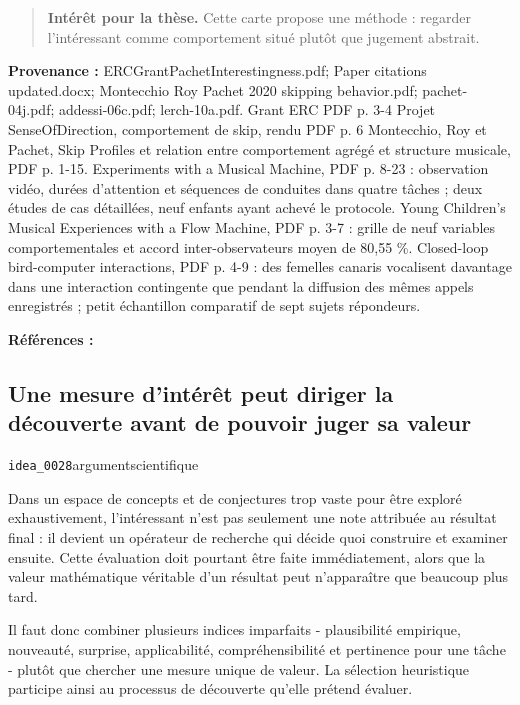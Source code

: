 \documentclass[10pt,a4paper]{article}
\begin{document}
\begin{quote}
\textbf{Intérêt pour la thèse.} Cette carte propose une méthode : regarder l'intéressant comme comportement situé plutôt que jugement abstrait.
\end{quote}
{\footnotesize\color{metadata}\textbf{Provenance :} ERCGrantPachetInterestingness.pdf; Paper citations updated.docx; Montecchio Roy Pachet 2020 skipping behavior.pdf; pachet-04j.pdf; addessi-06c.pdf; lerch-10a.pdf. Grant ERC PDF p. 3-4 Projet SenseOfDirection, comportement de skip, rendu PDF p. 6 Montecchio, Roy et Pachet, Skip Profiles et relation entre comportement agrégé et structure musicale, PDF p. 1-15. Experiments with a Musical Machine, PDF p. 8-23 : observation vidéo, durées d'attention et séquences de conduites dans quatre tâches ; deux études de cas détaillées, neuf enfants ayant achevé le protocole. Young Children's Musical Experiences with a Flow Machine, PDF p. 3-7 : grille de neuf variables comportementales et accord inter-observateurs moyen de 80,55 \%. Closed-loop bird-computer interactions, PDF p. 4-9 : des femelles canaris vocalisent davantage dans une interaction contingente que pendant la diffusion des mêmes appels enregistrés ; petit échantillon comparatif de sept sujets répondeurs.\par}
{\footnotesize\color{metadata}\textbf{Références :} \parencite{montecchio2020skipping,addessi2005experiments,addessi2006flowmachine,lerch2011closedloop}\par}

\subsection{Une mesure d'intérêt peut diriger la découverte avant de pouvoir juger sa valeur}
{\small\color{metadata} \texttt{idea\_0028}\quad\textbullet\quad argument\quad\textbullet\quad scientifique\par}

Dans un espace de concepts et de conjectures trop vaste pour être exploré exhaustivement, l'intéressant n'est pas seulement une note attribuée au résultat final : il devient un opérateur de recherche qui décide quoi construire et examiner ensuite. Cette évaluation doit pourtant être faite immédiatement, alors que la valeur mathématique véritable d'un résultat peut n'apparaître que beaucoup plus tard.

Il faut donc combiner plusieurs indices imparfaits - plausibilité empirique, nouveauté, surprise, applicabilité, compréhensibilité et pertinence pour une tâche - plutôt que chercher une mesure unique de valeur. La sélection heuristique participe ainsi au processus de découverte qu'elle prétend évaluer.
\end{document}
